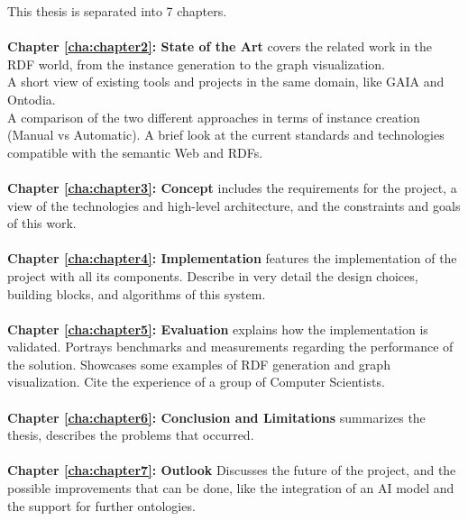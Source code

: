 This thesis is separated into 7 chapters.
\\
\\
\textbf{Chapter \ref{cha:chapter2}: State of the Art} covers the related work in the RDF world, from the instance generation to the graph visualization. 
\\
A short view of existing tools and projects in the same domain, like GAIA and Ontodia.
\\
A comparison of the two different approaches in terms of instance creation (Manual vs Automatic).
A brief look at the current standards and technologies compatible with the semantic Web and RDFs.
\\
\\
\textbf{Chapter \ref{cha:chapter3}: Concept} includes the requirements for the project, a view of the technologies and high-level architecture, and the constraints and goals of this work.
\\
\\
\textbf{Chapter \ref{cha:chapter4}: Implementation} features the implementation of the project with all its components. Describe in very detail the design choices, building blocks, and algorithms of this system.
\\
\\
\textbf{Chapter \ref{cha:chapter5}: Evaluation} explains how the implementation is validated. Portrays benchmarks and measurements regarding the performance of the solution. Showcases some examples of RDF generation and graph visualization. Cite the experience of a group of Computer Scientists. 
\\
\\
\textbf{Chapter \ref{cha:chapter6}: Conclusion and Limitations} summarizes the thesis, describes the problems that occurred. 
\\
\\
\textbf{Chapter \ref{cha:chapter7}: Outlook} Discusses the future of the project, and the possible improvements that can be done, like the integration of an AI model and the support for further ontologies.